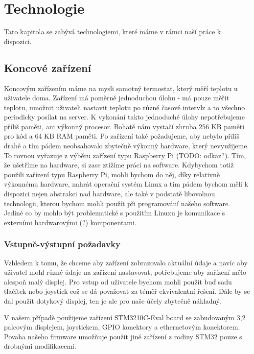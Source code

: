 \section{Technologie}
Tato kapitola se zabývá technologiemi, které máme v rámci naší práce k dispozici.

\subsection{Koncové zařízení}
Koncovým zařízením máme na mysli samotný termostat, který měří teplotu u uživatele doma.
Zařízení má poměrně jednoduchou úlohu - má pouze měřit teplotu, umožnit uživateli nastavit teplotu po
různé časové intervlz a to všechno periodicky posílat na server.
K vykonání takto jednoduché úlohy nepotřebujeme příliš paměti, ani výkonný procesor.
Bohatě nám vystačí zhruba 256 KB paměti pro kód a 64 KB RAM paměti.
Po zařízení také požadujeme, aby nebylo příliš drahé a tím pádem neobsahovalo zbytečně výkonný
hardware, který nevyužijeme.
To rovnou vyřazuje z výběru zařízení typu Raspberry Pi (TODO: odkaz?).
Tím, že ušetříme na hardware, si zase ztížíme práci na software.
Kdybychom totiž použili zařízení typu Raspberry Pi, mohli bychom do něj, díky relativně
výkonnému hardware, nahrát operační systém Linux a tím pádem bychom měli k dispozici nejen
abstrakci nad hardware, ale také v podstatě libovolnou technologii, kterou bychom mohli použít
při programování našeho software.
Jediné co by mohlo být problematické s použitím Linuxu je komunikace s externími hardwarovými (?)
komponentami.


\subsubsection{Vstupně-výstupní požadavky}
Vzhledem k tomu, že chceme aby zařízení zobrazovalo aktuální údaje a navíc aby uživatel mohl
různé údaje na zařízení nastavovat, potřebujeme aby zařízení mělo alespoň malý displej.
Pro vstup od uživatele bychom mohli použít buď sadu tlačítek nebo joystick což se dá považovat
za téměř ekvivalentní řešení.
Dále by se dal použít dotykový displej, ten je ale pro naše účely zbytečně nákladný.

V našem případě použijeme zařízení STM3210C-Eval board se zabudovaným 3,2 palcovým displejem,
joystickem, GPIO konektory a ethernetovým konektorem.
Povaha našeho firmware umožňuje použít jiné zařízení z rodiny STM32 pouze s drobnými modifikacemi.

